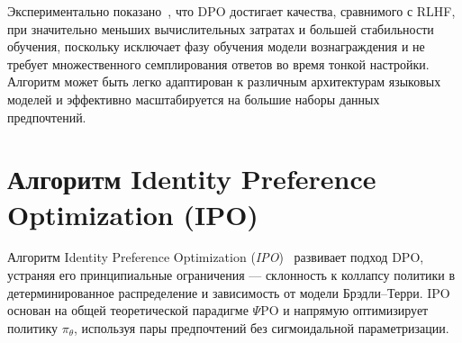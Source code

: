 \documentclass[a4paper,12pt]{article}
\begin{document}
\medskip
\noindent{}
\medskip

Экспериментально показано~\cite{rafailov2023direct}, что DPO достигает качества, сравнимого с RLHF, при значительно меньших вычислительных затратах и большей стабильности обучения, поскольку исключает фазу обучения модели вознаграждения и не требует множественного семплирования ответов во время тонкой настройки. Алгоритм может быть легко адаптирован к различным архитектурам языковых моделей и эффективно масштабируется на большие наборы данных предпочтений.

\section{Алгоритм Identity Preference Optimization (IPO)}

Алгоритм Identity Preference Optimization (\textit{IPO})~\cite{azar2024general} развивает подход DPO, устраняя его принципиальные ограничения — склонность к коллапсу политики в детерминированное распределение и зависимость от модели Брэдли–Терри. IPO основан на общей теоретической парадигме $\Psi$PO и напрямую оптимизирует политику $\pi_\theta$, используя пары предпочтений без сигмоидальной параметризации.
\end{document}
